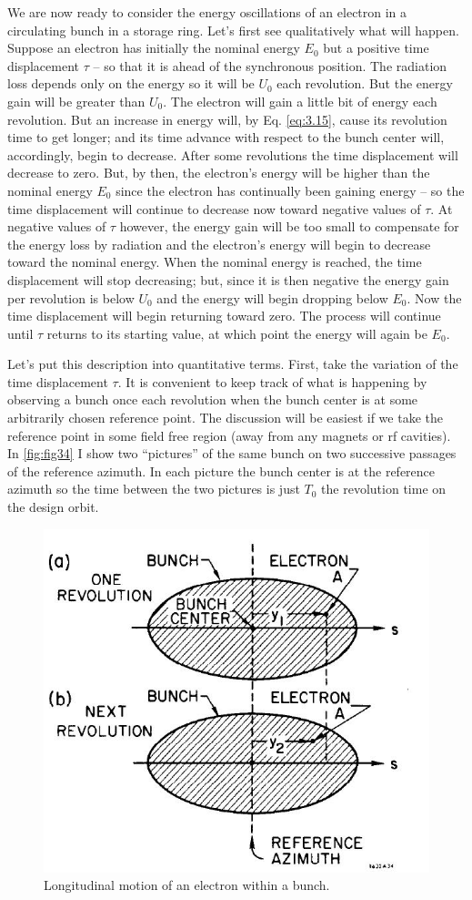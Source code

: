 We are now ready to consider the energy oscillations of an electron in a circulating bunch in a storage ring. Let's first see qualitatively what will happen. Suppose an electron has initially the nominal energy $E_0$ but a positive time displacement $\tau$ -- so that it is ahead of the synchronous position. The radiation loss depends only on the energy so it will be $U_0$ each revolution. But the energy gain will be greater than $U_0$. The electron will gain a little bit of energy each revolution. But an increase in energy will, by Eq. \eqref{eq:3.15}, cause its revolution time to get longer; and its time advance with respect to the bunch center will, accordingly, begin to decrease. After some revolutions the time displacement will decrease to zero. But, by then, the electron's energy will be higher than the nominal energy $E_0$ since the electron has continually been gaining energy -- so the time displacement will continue to decrease now toward negative values of $\tau$. At negative values of $\tau$ however, the energy gain will be too small to compensate for the energy loss by radiation and the electron's energy will begin to decrease toward the nominal energy. When the nominal energy is reached, the time displacement will stop decreasing; but, since it is then negative the energy gain per revolution is below $U_0$ and the energy will begin dropping below $E_0$. Now the time displacement will begin returning toward zero. The process will continue until $\tau$ returns to its starting value, at which point the energy will again be $E_0$.

Let's put this description into quantitative terms. First, take the variation of the time displacement $\tau$. It is convenient to keep track of what is happening by observing a bunch once each revolution when the bunch center is at some arbitrarily chosen reference point. The discussion will be easiest if we take the reference point in some field free region (away from any magnets or rf cavities). In \autoref{fig:fig34} I show two “pictures” of the same bunch on two successive passages of the reference azimuth. In each picture the bunch center is at the reference azimuth so the time between the two pictures is just $T_0$ the revolution time on the design orbit.
 
\begin{figure}[!htb]
	\centering
	\includegraphics[width=0.6\linewidth]{./Figuras/fig34.jpeg}
	\caption{Longitudinal motion of an electron within a bunch.}
	\label{fig:fig34}
\end{figure}

